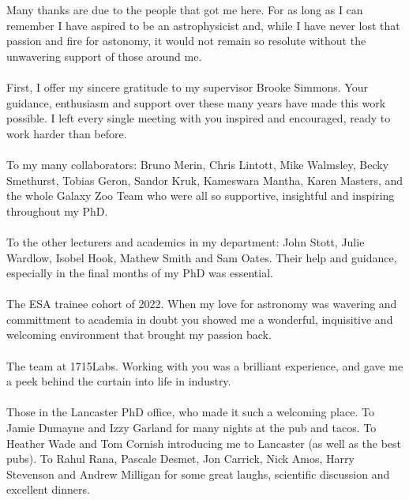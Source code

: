 

\begin{acknowledgements}      %
Many thanks are due to the people that got me here. For as long as I can remember I have aspired to be an astrophysicist and, while I have never lost that passion and fire for astonomy, it would not remain so resolute without the unwavering support of those around me.
\\
\\
First, I offer my sincere gratitude to my supervisor Brooke Simmons. Your guidance, enthusiasm and support over these many years have made this work possible. I left every single meeting with you inspired and encouraged, ready to work harder than before.
\\
\\
To my many collaborators: Bruno Merin, Chris Lintott, Mike Walmsley, Becky Smethurst, Tobias Geron, Sandor Kruk, Kameswara Mantha, Karen Masters, and the whole Galaxy Zoo Team who were all so supportive, insightful and inspiring throughout my PhD. 
\\
\\
To the other lecturers and academics in my department: John Stott, Julie Wardlow, Isobel Hook, Mathew Smith and Sam Oates. Their help and guidance, especially in the final months of my PhD was essential.
\\
\\
The ESA trainee cohort of 2022. When my love for astronomy was wavering and committment to academia in doubt you showed me a wonderful, inquisitive and welcoming environment that brought my passion back.
\\
\\
The team at 1715Labs. Working with you was a brilliant experience, and gave me a peek behind the curtain into life in industry.
\\
\\
Those in the Lancaster PhD office, who made it such a welcoming place. To Jamie Dumayne and Izzy Garland for many nights at the pub and tacos. To Heather Wade and Tom Cornish introducing me to Lancaster (as well as the best pubs). To Rahul Rana, Pascale Desmet, Jon Carrick, Nick Amos, Harry Stevenson and Andrew Milligan for some great laughs, scientific discussion and excellent dinners.

\end{acknowledgements}
